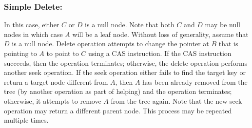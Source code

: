 \subsubsection{Simple Delete:}
	In this case, either $C$ or $D$ is a null node. Note that both $C$ and $D$ may be null nodes in which case $A$ will be a leaf node. Without loss of generality, assume that $D$ is a null node. Delete operation attempts to change the pointer at $B$ that is pointing to $A$ to point to $C$ using a CAS instruction. If the CAS instruction succeeds, then the operation terminates; otherwise, the delete operation performs another seek operation. If the seek operation either fails to find the target key or return a target node different from $A$, then $A$ has been already removed from the tree (by another operation as part of helping) and the operation terminates; otherwise, it attempts to remove $A$ from the tree again. Note that the new seek operation may return a different parent node. This process may be repeated multiple times.
